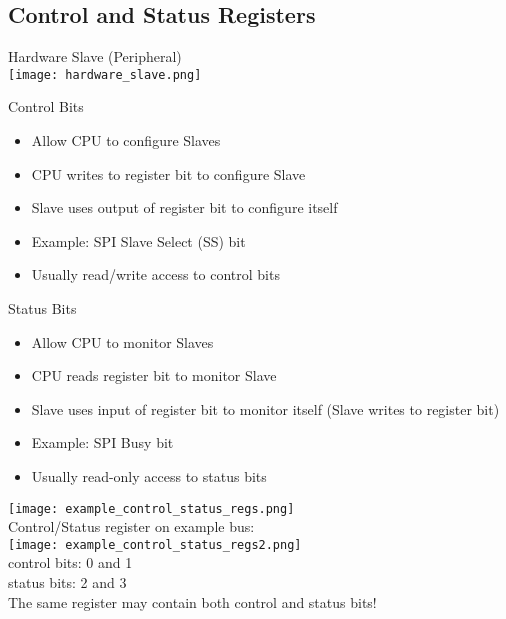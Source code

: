 \subsection{Control and Status Registers}

\begin{definition}{Hardware Slave (Peripheral)}\\
    \texttt{[image: hardware\_slave.png]}
\end{definition}


\begin{concept}{Control Bits}
    \begin{itemize}
        \item Allow CPU to configure Slaves
        \item CPU writes to register bit to configure Slave
        \item Slave uses output of register bit to configure itself
        \item Example: SPI Slave Select (SS) bit
        \item Usually read/write access to control bits
    \end{itemize}
\end{concept}

\begin{concept}{Status Bits}
    \begin{itemize}
        \item Allow CPU to monitor Slaves
        \item CPU reads register bit to monitor Slave
        \item Slave uses input of register bit to monitor itself (Slave writes to register bit)
        \item Example: SPI Busy bit
        \item Usually read-only access to status bits
    \end{itemize}
\end{concept}

\multend

\begin{example}
\texttt{[image: example\_control\_status\_regs.png]}\\
Control/Status register on example bus:\\
\texttt{[image: example\_control\_status\_regs2.png]}\\
control bits: 0 and 1\\
status bits: 2 and 3\\
The same register may contain both control and status bits!
\end{example}

